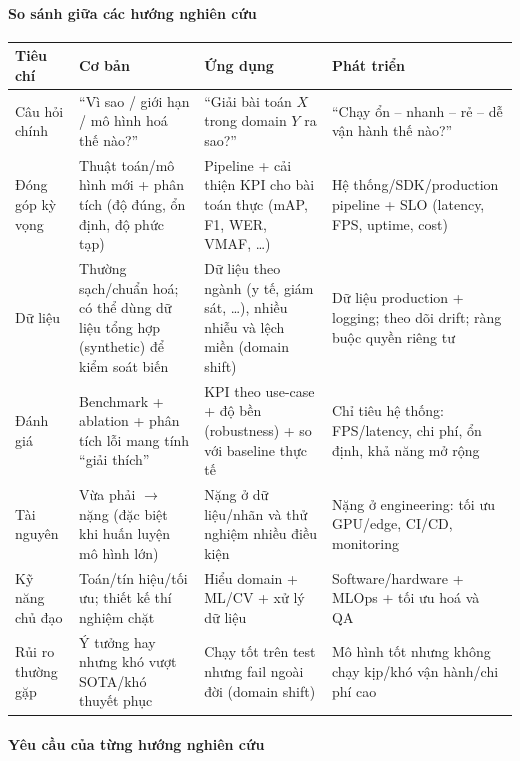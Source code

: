 \paragraph{So sánh giữa các hướng nghiên cứu}
\begin{table}[h]
\centering
\renewcommand{\arraystretch}{1.25}
\begin{tabular}{p{3.0cm} p{4.2cm} p{4.2cm} p{4.2cm}}
\hline
\textbf{Tiêu chí} & \textbf{Cơ bản} & \textbf{Ứng dụng} & \textbf{Phát triển} \\
\hline
Câu hỏi chính &
``Vì sao / giới hạn / mô hình hoá thế nào?'' &
``Giải bài toán $X$ trong domain $Y$ ra sao?'' &
``Chạy ổn -- nhanh -- rẻ -- dễ vận hành thế nào?'' \\
\hline
Đóng góp kỳ vọng &
Thuật toán/mô hình mới + phân tích (độ đúng, ổn định, độ phức tạp) &
Pipeline + cải thiện KPI cho bài toán thực (mAP, F1, WER, VMAF, \ldots) &
Hệ thống/SDK/production pipeline + SLO (latency, FPS, uptime, cost) \\
\hline
Dữ liệu &
Thường sạch/chuẩn hoá; có thể dùng dữ liệu tổng hợp (synthetic) để kiểm soát biến &
Dữ liệu theo ngành (y tế, giám sát, \ldots), nhiều nhiễu và lệch miền (domain shift) &
Dữ liệu production + logging; theo dõi drift; ràng buộc quyền riêng tư \\
\hline
Đánh giá &
Benchmark + ablation + phân tích lỗi mang tính ``giải thích'' &
KPI theo use-case + độ bền (robustness) + so với baseline thực tế &
Chỉ tiêu hệ thống: FPS/latency, chi phí, ổn định, khả năng mở rộng \\
\hline
Tài nguyên &
Vừa phải $\rightarrow$ nặng (đặc biệt khi huấn luyện mô hình lớn) &
Nặng ở dữ liệu/nhãn và thử nghiệm nhiều điều kiện &
Nặng ở engineering: tối ưu GPU/edge, CI/CD, monitoring \\
\hline
Kỹ năng chủ đạo &
Toán/tín hiệu/tối ưu; thiết kế thí nghiệm chặt &
Hiểu domain + ML/CV + xử lý dữ liệu &
Software/hardware + MLOps + tối ưu hoá và QA \\
\hline
Rủi ro thường gặp &
Ý tưởng hay nhưng khó vượt SOTA/khó thuyết phục &
Chạy tốt trên test nhưng fail ngoài đời (domain shift) &
Mô hình tốt nhưng không chạy kịp/khó vận hành/chi phí cao \\
\hline
\end{tabular}
\end{table}

\paragraph{Yêu cầu của từng hướng nghiên cứu}

